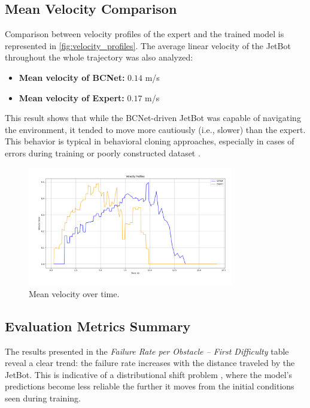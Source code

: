 \subsection{Mean Velocity Comparison}

Comparison between velocity profiles of the expert and the trained model is represented in \autoref{fig:velocity_profiles}. The average linear velocity of the JetBot throughout the whole trajectory was also analyzed:

\begin{itemize}
  \item \textbf{Mean velocity of BCNet:} $0.14$ m/s
  \item \textbf{Mean velocity of Expert:} $0.17$ m/s
\end{itemize}

This result shows that while the BCNet-driven JetBot was capable of navigating the environment, it tended to move more cautiously (i.e., slower) than the expert. This behavior is typical in behavioral cloning approaches, especially in cases of errors during training or poorly constructed dataset \autocite{bühler2020drivingghostsbehavioralcloning}.

\begin{figure}[H]
  \centering
  \includegraphics[width=0.8\textwidth]{Images/Evaluation/velocity_profiles.png}
  \caption{Mean velocity over time.}
  \label{fig:velocity_profiles}
\end{figure}

\subsection{Evaluation Metrics Summary}

The results presented in the \textit{Failure Rate per Obstacle – First Difficulty} table reveal a clear trend: the failure rate increases with the distance traveled by the JetBot. This is indicative of a distributional shift problem \autocite{codevilla2019exploring}, where the model's predictions become less reliable the further it moves from the initial conditions seen during training.

